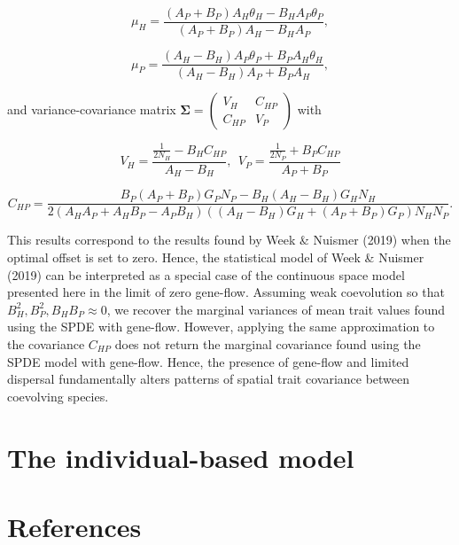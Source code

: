 \documentclass{article}
\begin{document}
\[\mu_H=\frac{(A_P+B_P)A_H\theta_H-B_HA_P\theta_P}{(A_P+B_P)A_H-B_HA_P},\]

\[\mu_P=\frac{(A_H-B_H)A_P\theta_P+B_PA_H\theta_H}{(A_H-B_H)A_P+B_PA_H},\]

and variance-covariance matrix
\(\pmb\Sigma=\left(\begin{smallmatrix}V_H & C_{HP} \\ C_{HP} & V_P\end{smallmatrix}\right)\)
with

\[V_H=\frac{\frac{1}{2N_H}-B_HC_{HP}}{A_H-B_H}, \ \ V_P=\frac{\frac{1}{2N_P}+B_PC_{HP}}{A_P+B_P}\]

\[C_{HP}=\frac{B_P(A_P+B_P)G_PN_P-B_H(A_H-B_H)G_HN_H}{2(A_HA_P+A_HB_P-A_PB_H)((A_H-B_H)G_H+(A_P+B_P)G_P)N_HN_P}.\]

This results correspond to the results found by Week \& Nuismer (2019)
when the optimal offset is set to zero. Hence, the statistical model of
Week \& Nuismer (2019) can be interpreted as a special case of the
continuous space model presented here in the limit of zero gene-flow.
Assuming weak coevolution so that \(B_H^2,B_P^2,B_HB_P\approx0\), we
recover the marginal variances of mean trait values found using the SPDE
with gene-flow. However, applying the same approximation to the
covariance \(C_{HP}\) does not return the marginal covariance found
using the SPDE model with gene-flow. Hence, the presence of gene-flow
and limited dispersal fundamentally alters patterns of spatial trait
covariance between coevolving species.

\hypertarget{the-individual-based-model}{%
\section{\texorpdfstring{The individual-based model
\label{ibs-app}}{The individual-based model }}\label{the-individual-based-model}}

\newpage

\hypertarget{references}{%
\section*{References}\label{references}}
\end{document}
